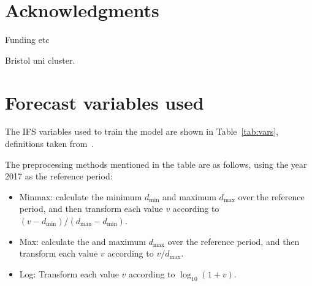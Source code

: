 \documentclass{article}
\begin{document}
\section*{Acknowledgments}

Funding etc

Bristol uni cluster.



\appendix

\section{Forecast variables used}\label{app:fcst_vars}
The IFS variables used to train the model are shown in Table~\ref{tab:vars}, definitions taken from~\citep{ecmwf_parameter_2023}.

The preprocessing methods mentioned in the table are as follows, using the year 2017 as the reference period:
\begin{itemize}
    \item Minmax: calculate the minimum $d_{\text{min}}$ and maximum $d_{\text{max}}$ over the reference period, and then transform each value $v$ according to $(v - d_{\text{min}}) / (d_{\text{max}} - d_{\text{min}})$.
    \item Max: calculate the and maximum $d_{\text{max}}$ over the reference period, and then transform each value $v$ according to $v  / d_{\text{max}}$.
    \item Log: Transform each value $v$ according to $\log_{10}(1+v)$.
\end{itemize}
\end{document}
